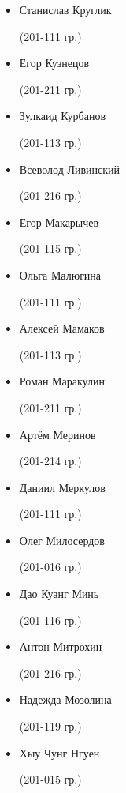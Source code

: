 \begin{multicols}{2}
\begin{small}
\begin{itemize}
	\item[] Станислав Круглик\begin{tiny} (201-111 гр.)\end{tiny}
	\item[] Егор Кузнецов\begin{tiny} (201-211 гр.)\end{tiny}
	\item[] Зулкаид Курбанов\begin{tiny} (201-113 гр.)\end{tiny}
	\item[] Всеволод Ливинский\begin{tiny} (201-216 гр.)\end{tiny}
	\item[] Егор Макарычев\begin{tiny} (201-115 гр.)\end{tiny}
	\item[] Ольга Малюгина\begin{tiny} (201-111 гр.)\end{tiny}
	\item[] Алексей Мамаков\begin{tiny} (201-113 гр.)\end{tiny}
	\item[] Роман Маракулин\begin{tiny} (201-211 гр.)\end{tiny}
	\item[] Артём Меринов\begin{tiny} (201-214 гр.)\end{tiny}
	\item[] Даниил Меркулов\begin{tiny} (201-111 гр.)\end{tiny}
	\item[] Олег Милосердов\begin{tiny} (201-016 гр.)\end{tiny}
	\item[] Дао Куанг Минь\begin{tiny} (201-116 гр.)\end{tiny}
	\item[] Антон Митрохин\begin{tiny} (201-216 гр.)\end{tiny}
	\item[] Надежда Мозолина\begin{tiny} (201-119 гр.)\end{tiny}
	\item[] Хыу Чунг Нгуен\begin{tiny} (201-015 гр.)\end{tiny}

\end{itemize}
\end{small}
\end{multicols}
